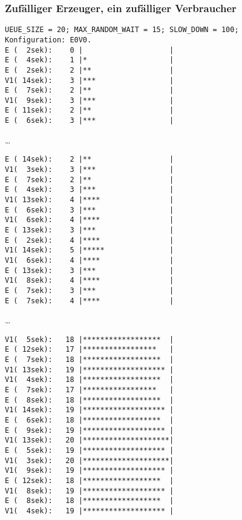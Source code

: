 \subsubsection{Zufälliger Erzeuger, ein zufälliger Verbraucher} %
\label{ssub:zufalliger_erzeuger_1_zufallige_verbraucher}
\begin{quellcode}[H]
\begin{scriptsize}
\begin{spacing}{1.0}
\begin{verbatim}
UEUE_SIZE = 20; MAX_RANDOM_WAIT = 15; SLOW_DOWN = 100;
Konfiguration: E0V0.
E (  2sek):    0 |                    |
E (  4sek):    1 |*                   |
E (  2sek):    2 |**                  |
V1( 14sek):    3 |***                 |
E (  7sek):    2 |**                  |
V1(  9sek):    3 |***                 |
E ( 11sek):    2 |**                  |
E (  6sek):    3 |***                 |
\end{verbatim}

…

\begin{verbatim}
E ( 14sek):    2 |**                  |
V1(  3sek):    3 |***                 |
E (  7sek):    2 |**                  |
E (  4sek):    3 |***                 |
V1( 13sek):    4 |****                |
E (  6sek):    3 |***                 |
V1(  6sek):    4 |****                |
E ( 13sek):    3 |***                 |
E (  2sek):    4 |****                |
V1( 14sek):    5 |*****               |
V1(  6sek):    4 |****                |
E ( 13sek):    3 |***                 |
V1(  8sek):    4 |****                |
E (  7sek):    3 |***                 |
E (  7sek):    4 |****                |
\end{verbatim}

…

\begin{verbatim}
V1(  5sek):   18 |******************  |
E ( 12sek):   17 |*****************   |
E (  7sek):   18 |******************  |
V1( 13sek):   19 |******************* |
V1(  4sek):   18 |******************  |
E (  7sek):   17 |*****************   |
E (  8sek):   18 |******************  |
V1( 14sek):   19 |******************* |
E (  6sek):   18 |******************  |
E (  9sek):   19 |******************* |
V1( 13sek):   20 |********************|
E (  5sek):   19 |******************* |
V1(  3sek):   20 |********************|
V1(  9sek):   19 |******************* |
E ( 12sek):   18 |******************  |
V1(  8sek):   19 |******************* |
E (  8sek):   18 |******************  |
V1(  4sek):   19 |******************* |
\end{verbatim}
\caption{zufälliger Erzeuger, 1 zufälliger Verbraucher}
\label{out:esv}
\end{spacing}
\end{scriptsize}
\end{quellcode}



